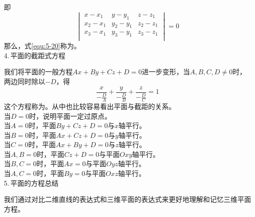 即\begin{equation}
	\begin{vmatrix}
		x-x_1 & y-y_1 & z-z_1\\
		x_2-x_1 & y_2-y_1 & z_2-z_1\\
		x_3-x_1 & y_3-y_1 & z_3-z_1\\
	\end{vmatrix}=0
\label{equ:5-20}
\end{equation}
那么，式\ref{equ:5-20}称为。\\
4.$\,$平面的截距式方程
\par 我们将平面的一般方程$Ax+By+Cz+D=0$进一步变形，当$A,B,C,D\neq0$时，两边同时除以$-D$，得
\begin{equation}
	\displaystyle \frac{x}{-\frac{D}{A}}+\frac{y}{-\frac{D}{B}}+\frac{z}{-\frac{D}{C}}
=1\end{equation}
这个方程称为。从中也比较容易看出平面与截距的关系。\\
当$D=0$时，说明平面一定过原点。\\
当$A=0$时，平面$By+Cz+D=0$与$x$轴平行。\\
当$B=0$时，平面$Ax+Cz+D=0$与$y$轴平行。\\
当$C=0$时，平面$Ax+By+D=0$与$z$轴平行。\\
当$A,B=0$时，平面$Cz+D=0$与平面$Oxy$轴平行。\\
当$B,C=0$时，平面$Ax=0$与平面$Oyz$轴平行。\\
当$A,C=0$时，平面$By=0$与平面$Oxz$轴平行。\\
5.$\,$平面的方程总结
\par 我们通过对比二维直线的表达式和三维平面的表达式来更好地理解和记忆三维平面方程。
\begin{table}[h]
	\centering
\end{table}
